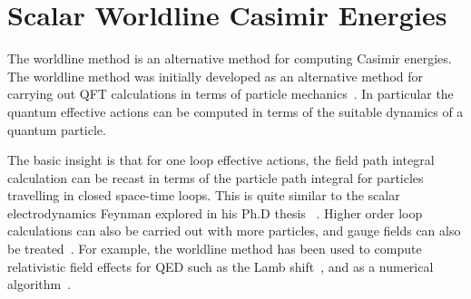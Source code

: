 




\section{Scalar Worldline Casimir Energies}

The worldline method is an alternative method for computing Casimir energies.
  The worldline method was initially developed as an alternative method for 
carrying out QFT calculations in terms of particle 
mechanics~\cite{McKeon1993, Strassler1992,Schubert2001}.
  In particular the quantum effective actions can be computed in terms of
 the suitable dynamics of a quantum particle.

The basic insight is that for one loop effective actions, 
the field path integral calculation can be recast in terms of the particle path
 integral for particles travelling in closed space-time loops.
  This is quite similar to the scalar electrodynamics Feynman explored
 in his Ph.D thesis~\cite{Feynman1942, Brown2005}
.
  Higher order loop calculations can also be carried out with more particles, 
and gauge fields can also be treated~\cite{Schubert2001}.
  For example, the worldline method has been used to compute relativistic
 field effects for QED such as the Lamb shift~\cite{Schmidt1995}, and as a numerical algorithm~\cite{Mazur2014}.

